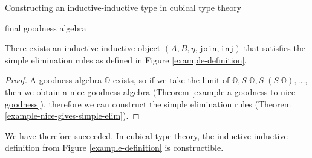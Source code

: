 \documentclass[acmsmall,review]{acmart}\settopmatter{printfolios=true,printccs=false,printacmref=false}
\newcommand{\bbO}{\mathbb{O}}
\newcommand{\join}{\texttt{join}}
\newcommand{\inj}{\texttt{inj}}
\begin{document}
\begin{section}{Constructing an inductive-inductive type in cubical type theory}
\begin{subsection}{final goodness algebra}
\begin{theorem}\label{example-constructed-II}
    There exists an inductive-inductive object $(A, B, \eta, \join, \inj)$ that satisfies the simple elimination rules as defined in Figure \ref{example-definition}.
\end{theorem}
\begin{proof}
    A goodness algebra $\bbO$ exists, so if we take the limit of $\bbO, S\;\bbO, S\;(S\;\bbO), \dots$, then we obtain a nice goodness algebra (Theorem \ref{example-a-goodness-to-nice-goodness}), therefore we can construct the simple elimination rules (Theorem \ref{example-nice-gives-simple-elim}).
\end{proof}

We have therefore succeeded. In cubical type theory, the inductive-inductive definition from Figure \ref{example-definition} is constructible.

\end{subsection}

\end{section}
\end{document}
